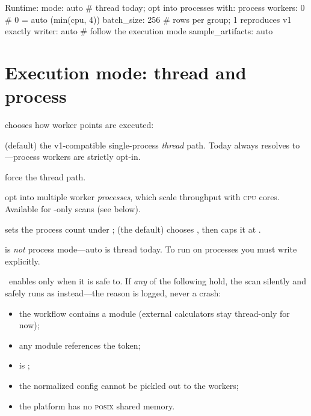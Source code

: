 \begin{yamlwin}
Runtime:
  mode: auto           # thread today; opt into processes with: process
  workers: 0           # 0 = auto (min(cpu, 4))
  batch_size: 256      # rows per group; 1 reproduces v1 exactly
  writer: auto         # follow the execution mode
  sample_artifacts: auto
\end{yamlwin}

\section{Execution mode: thread and process}
\label{sec:rt-mode}

 chooses how worker points are executed:

\begin{description}[style=nextline, leftmargin=1.2em]
  \item[\code{auto}] (default) the v1-compatible single-process \emph{thread} path. Today
         always resolves to ---process workers are strictly opt-in.
  \item[\code{thread}] force the thread path.
  \item[\code{process}] opt into multiple worker \emph{processes}, which scale throughput with
        \textsc{cpu} cores. Available for -only scans (see below).
\end{description}

\noindent {} sets the process count under ;  (the default)
chooses , then caps it at .

\begin{jwarn}
 is \emph{not} process mode---auto is thread today. To run on processes you must
write  explicitly.
\end{jwarn}

\Jarvis\ enables  only when it is safe to. If \emph{any} of the following hold,
the scan silently and safely runs as  instead---the reason is logged, never a crash:

\begin{itemize}
  \item the workflow contains a  module (external calculators stay thread-only
        for now);
  \item any module references the  token;
  \item {} is ;
  \item the normalized config cannot be pickled out to the workers;
  \item the platform has no \textsc{posix} shared memory.
\end{itemize}

